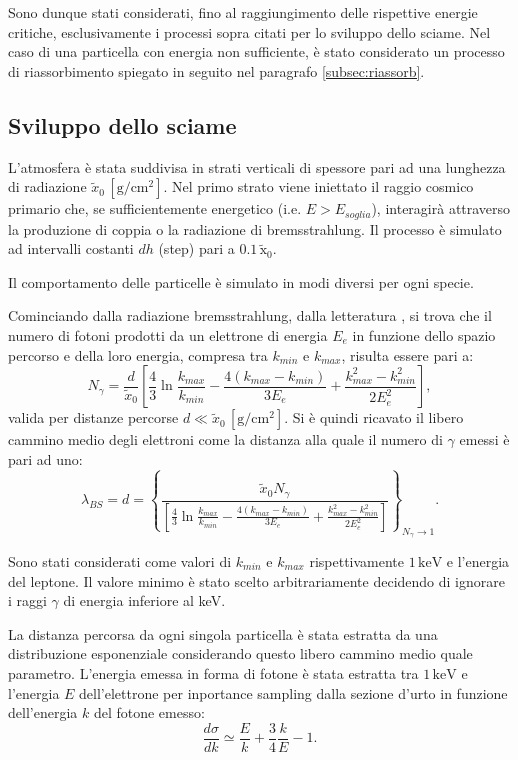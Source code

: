 \documentclass[10pt,a4paper,usenatbib]{article}
\newcommand*{\unit}[1]{\ensuremath{\mathrm{\,#1}}}                              %
\begin{document}
Sono dunque stati considerati, fino al raggiungimento delle rispettive energie critiche, esclusivamente i processi sopra citati per lo sviluppo dello sciame. Nel caso di una particella con energia non sufficiente, è stato considerato un processo di riassorbimento spiegato in seguito nel paragrafo \ref{subsec:riassorb}. 

\subsection{Sviluppo dello sciame}
L'atmosfera è stata suddivisa in strati verticali di spessore pari ad una lunghezza di radiazione $\tilde{x}_0 \unit{[g/cm^2]}$. Nel primo strato viene iniettato il raggio cosmico primario che, se sufficientemente energetico (i.e. $E > E_{soglia}$), interagirà attraverso la produzione di coppia o la radiazione di bremsstrahlung. Il processo è simulato ad intervalli costanti $dh$ (step) pari a $0.1\unit{\tilde{x}_0}$.

Il comportamento delle particelle è simulato in modi diversi per ogni specie.
 
Cominciando dalla radiazione bremsstrahlung, dalla letteratura \citep{PassParticMatterPDG}, si trova che il numero di fotoni prodotti da un elettrone di energia $E_e$ in funzione dello spazio percorso e della loro energia, compresa tra $k_{min}$ e $k_{max}$, risulta essere pari a: 
\begin{equation}
N_\gamma = \frac{d}{\tilde{x}_0}\left[\frac{4}{3}\ln{\frac{k_{max}}{k_{min}}}-\frac{4(k_{max} - k_{min})}{3E_e}+\frac{k_{max}^2 - k_{min}^2}{2E_e^2}\right],
\label{eq:Ngamma}
\end{equation}
valida per distanze percorse $d \ll \tilde{x}_0 \unit{[g/cm^2]}$. Si è quindi ricavato il libero cammino medio degli elettroni come la distanza alla quale il numero di $\gamma$ emessi è pari ad uno:
\begin{equation}
\lambda_{BS} = d = \left\{{\frac{\tilde{x}_0 N_\gamma}{\left[\frac{4}{3}\ln{\frac{k_{max}}{k_{min}}}-\frac{4(k_{max} - k_{min})}{3E_e}+\frac{k_{max}^2 - k_{min}^2}{2E_e^2}\right]}}\right\}_{N_\gamma \rightarrow 1}.
\label{eq:lambdaBS}
\end{equation}

Sono stati considerati come valori di $k_{min}$ e $k_{max}$ rispettivamente $1\unit{keV}$ e l'energia del leptone. Il valore minimo è stato scelto arbitrariamente decidendo di ignorare i raggi $\gamma$ di energia inferiore al keV.

La distanza percorsa da ogni singola particella è stata estratta da una distribuzione esponenziale considerando questo libero cammino medio quale parametro. L'energia emessa in forma di fotone è stata estratta tra $1 \unit{keV}$ e l'energia $E$ dell'elettrone per inportance sampling dalla sezione d'urto in funzione dell'energia $k$ del fotone emesso:
\begin{equation}
\frac{d\sigma}{dk} \simeq \frac{E}{k} + \frac 3 4 \frac{k}{E} - 1.
\label{eq:dSigma}
\end{equation}
\end{document}
